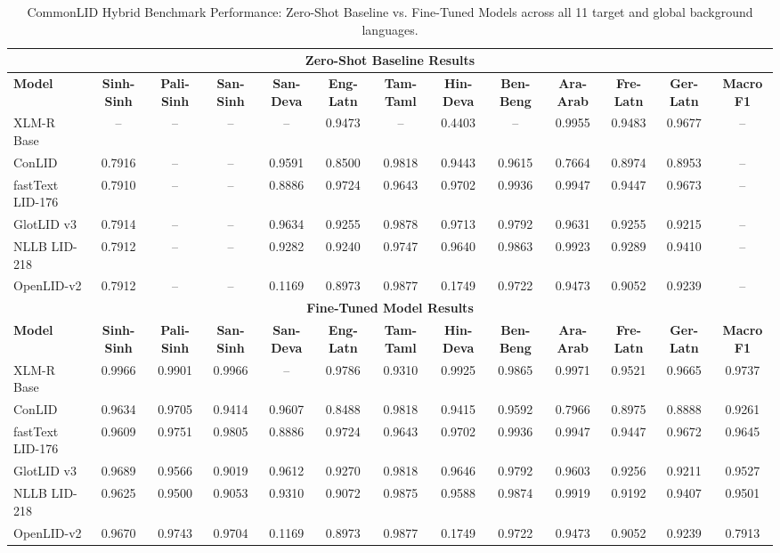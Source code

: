 \documentclass[11pt]{article}
\begin{document}
\begin{table}[p]
\caption{CommonLID Hybrid Benchmark Performance: Zero-Shot Baseline vs. Fine-Tuned Models across all 11 target and global background languages.}
\label{tab:common_full}
\begin{tabular}{l ccc cccccccc c}
\toprule
\multicolumn{13}{c}{\textbf{Zero-Shot Baseline Results}} \\
\midrule
\textbf{Model} & \textbf{Sinh-Sinh} & \textbf{Pali-Sinh} & \textbf{San-Sinh} & \textbf{San-Deva} & \textbf{Eng-Latn} & \textbf{Tam-Taml} & \textbf{Hin-Deva} & \textbf{Ben-Beng} & \textbf{Ara-Arab} & \textbf{Fre-Latn} & \textbf{Ger-Latn} & \textbf{Macro F1} \\
\midrule
XLM-R Base & -- & -- & -- & -- & 0.9473 & -- & 0.4403 & -- & 0.9955 & 0.9483 & 0.9677 & -- \\
ConLID & 0.7916 & -- & -- & 0.9591 & 0.8500 & 0.9818 & 0.9443 & 0.9615 & 0.7664 & 0.8974 & 0.8953 & -- \\
fastText LID-176 & 0.7910 & -- & -- & 0.8886 & 0.9724 & 0.9643 & 0.9702 & 0.9936 & 0.9947 & 0.9447 & 0.9673 & -- \\
GlotLID v3 & 0.7914 & -- & -- & 0.9634 & 0.9255 & 0.9878 & 0.9713 & 0.9792 & 0.9631 & 0.9255 & 0.9215 & -- \\
NLLB LID-218 & 0.7912 & -- & -- & 0.9282 & 0.9240 & 0.9747 & 0.9640 & 0.9863 & 0.9923 & 0.9289 & 0.9410 & -- \\
OpenLID-v2 & 0.7912 & -- & -- & 0.1169 & 0.8973 & 0.9877 & 0.1749 & 0.9722 & 0.9473 & 0.9052 & 0.9239 & -- \\
\midrule
\multicolumn{13}{c}{\textbf{Fine-Tuned Model Results}} \\
\midrule
\textbf{Model} & \textbf{Sinh-Sinh} & \textbf{Pali-Sinh} & \textbf{San-Sinh} & \textbf{San-Deva} & \textbf{Eng-Latn} & \textbf{Tam-Taml} & \textbf{Hin-Deva} & \textbf{Ben-Beng} & \textbf{Ara-Arab} & \textbf{Fre-Latn} & \textbf{Ger-Latn} & \textbf{Macro F1} \\
\midrule
XLM-R Base & 0.9966 & 0.9901 & 0.9966 & -- & 0.9786 & 0.9310 & 0.9925 & 0.9865 & 0.9971 & 0.9521 & 0.9665 & 0.9737 \\
ConLID & 0.9634 & 0.9705 & 0.9414 & 0.9607 & 0.8488 & 0.9818 & 0.9415 & 0.9592 & 0.7966 & 0.8975 & 0.8888 & 0.9261 \\
fastText LID-176 & 0.9609 & 0.9751 & 0.9805 & 0.8886 & 0.9724 & 0.9643 & 0.9702 & 0.9936 & 0.9947 & 0.9447 & 0.9672 & 0.9645 \\
GlotLID v3 & 0.9689 & 0.9566 & 0.9019 & 0.9612 & 0.9270 & 0.9818 & 0.9646 & 0.9792 & 0.9603 & 0.9256 & 0.9211 & 0.9527 \\
NLLB LID-218 & 0.9625 & 0.9500 & 0.9053 & 0.9310 & 0.9072 & 0.9875 & 0.9588 & 0.9874 & 0.9919 & 0.9192 & 0.9407 & 0.9501 \\
OpenLID-v2 & 0.9670 & 0.9743 & 0.9704 & 0.1169 & 0.8973 & 0.9877 & 0.1749 & 0.9722 & 0.9473 & 0.9052 & 0.9239 & 0.7913 \\
\bottomrule
\end{tabular}


\end{table}
\end{document}
